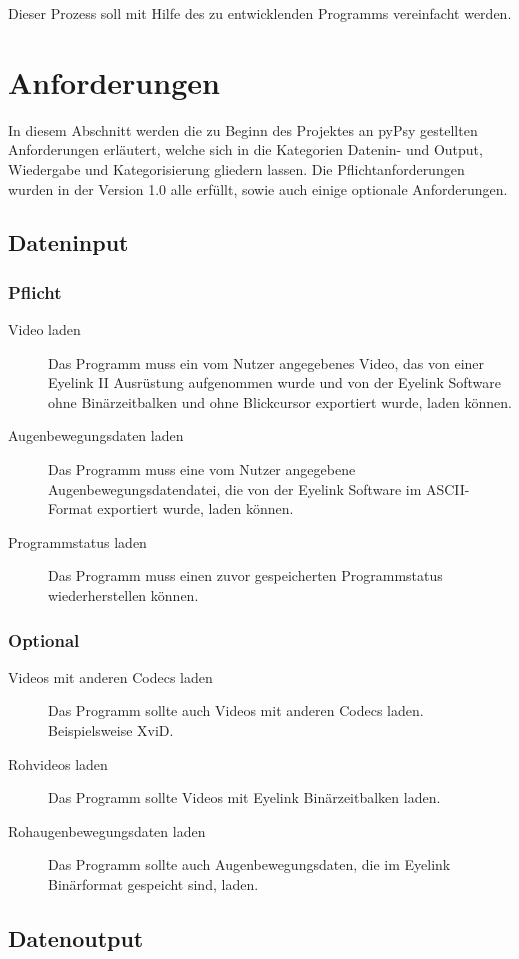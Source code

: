 \documentclass[a4paper,draft]{scrartcl}
\begin{document}
Dieser Prozess soll mit Hilfe des zu entwicklenden Programms vereinfacht werden.

\section{Anforderungen}
In diesem Abschnitt werden die zu Beginn des Projektes an pyPsy gestellten Anforderungen erläutert, welche sich in die Kategorien Datenin- und Output, Wiedergabe und Kategorisierung gliedern lassen. 
Die Pflichtanforderungen wurden in der Version 1.0 alle erfüllt, sowie auch einige optionale Anforderungen. 
\subsection{Dateninput}
\subsubsection{Pflicht}
\begin{description}
\item[Video laden] Das Programm muss ein vom Nutzer angegebenes Video, das von einer Eyelink II Ausrüstung aufgenommen wurde und von der Eyelink Software ohne Binärzeitbalken und ohne Blickcursor exportiert wurde, laden können.
\item[Augenbewegungsdaten laden] Das Programm muss eine vom Nutzer angegebene Augenbewegungsdatendatei, die von der Eyelink Software im ASCII-Format exportiert wurde, laden können.
\item[Programmstatus laden] Das Programm muss einen zuvor gespeicherten Programmstatus wiederherstellen können.
\end{description}
\subsubsection{Optional}
\begin{description}
\item[Videos mit anderen Codecs laden] Das Programm sollte auch Videos mit anderen Codecs laden. Beispielsweise XviD.
\item[Rohvideos laden] Das Programm sollte Videos mit Eyelink Binärzeitbalken laden.
\item[Rohaugenbewegungsdaten laden] Das Programm sollte auch Augenbewegungsdaten, die im Eyelink Binärformat gespeicht sind, laden.
\end{description}
\subsection{Datenoutput}
\end{document}
